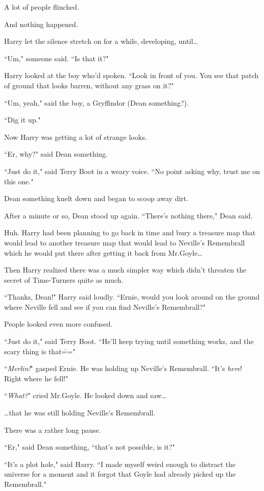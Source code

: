 A lot of people flinched.

And nothing happened.

Harry let the silence stretch on for a while, developing, until{\ldots}

``Um," someone said. ``Is that it?"

Harry looked at the boy who'd spoken. ``Look in front of you. You see that patch of ground that looks barren, without any grass on it?"

``Um, yeah," said the boy, a Gryffindor (Dean something?).

``Dig it up."

Now Harry was getting a lot of strange looks.

``Er, why?" said Dean something.

``Just do it," said Terry Boot in a weary voice. ``No point asking why, trust me on this one."

Dean something knelt down and began to scoop away dirt.

After a minute or so, Dean stood up again. ``There's nothing there," Dean said.

Huh. Harry had been planning to go back in time and bury a treasure map that would lead to another treasure map that would lead to Neville's Remembrall which he would put there after getting it back from Mr.\?Goyle{\ldots}

Then Harry realized there was a much simpler way which didn't threaten the secret of Time-Turners quite as much.

``Thanks, Dean!" Harry said loudly. ``Ernie, would you look around on the ground where Neville fell and see if you can find Neville's Remembrall?"

People looked even more confused.

``Just do it," said Terry Boot. ``He'll keep trying until something works, and the scary thing is that\==="

``\emph{Merlin!}" gasped Ernie. He was holding up Neville's Remembrall. ``It's \emph{here}! Right where he fell!"

``\emph{What?}" cried Mr.\?Goyle. He looked down and saw{\ldots}

{\ldots}that he was still holding Neville's Remembrall.

There was a rather long pause.

``Er," said Dean something, ``that's not possible, is it?"

``It's a plot hole," said Harry. ``I made myself weird enough to distract the universe for a moment and it forgot that Goyle had already picked up the Remembrall."

